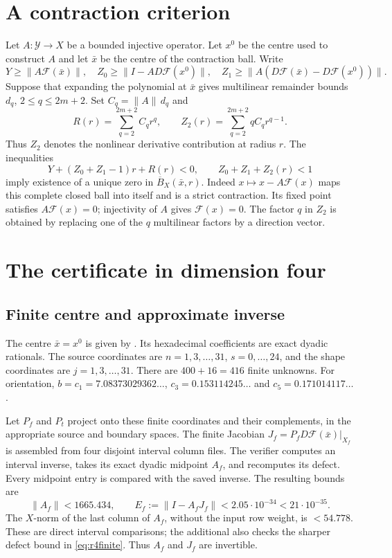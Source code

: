 \documentclass[11pt]{amsart}
\theoremstyle{remark}
\numberwithin{equation}{section}
\newcommand{\F}{\mathcal F}
\newcommand{\norm}[1]{\lVert#1\rVert}
\newcommand{\Pf}{P_f}
\newcommand{\Pt}{P_t}
\begin{document}
\section{A contraction criterion}\label{sec:contraction}
Let $A:\mathcal Y\to X$ be a bounded injective operator. Let $x^0$ be
the centre used to construct $A$ and let $\bar x$ be the centre of the
contraction ball. Write
\[
 Y\ge\norm{A\F(\bar x)},\quad
 Z_0\ge\norm{I-AD\F(x^0)},\quad
 Z_1\ge\norm{A(D\F(\bar x)-D\F(x^0))}.
\]
Suppose that expanding the polynomial at $\bar x$ gives multilinear
remainder bounds $d_q$, $2\le q\le 2m+2$. Set $C_q=\norm A\,d_q$ and
\[
 R(r)=\sum_{q=2}^{2m+2}C_qr^q,\qquad
 Z_2(r)=\sum_{q=2}^{2m+2}qC_qr^{q-1}.
\]
Thus $Z_2$ denotes the nonlinear derivative contribution at radius $r$.
The inequalities
\begin{equation}\label{eq:radii}
 Y+(Z_0+Z_1-1)r+R(r)<0,\qquad
 Z_0+Z_1+Z_2(r)<1
\end{equation}
imply existence of a unique zero in $\overline B_X(\bar x,r)$.
Indeed $x\mapsto x-A\F(x)$ maps this complete closed ball into itself and
is a strict contraction. Its fixed point satisfies $A\F(x)=0$;
injectivity of $A$ gives $\F(x)=0$. The factor $q$ in $Z_2$ is obtained
by replacing one of the $q$ multilinear factors by a direction vector.

\section{The certificate in dimension four}\label{sec:r4}
\subsection{Finite centre and approximate inverse}
The centre $\bar x=x^0$ is given by
. Its hexadecimal coefficients are
exact dyadic rationals. The source coordinates are $n=1,3,\ldots,31$,
$s=0,\ldots,24$, and the shape coordinates are $j=1,3,\ldots,31$.
There are $400+16=416$ finite unknowns. For orientation,
$b=c_1=7.08373029362\ldots$,
$c_3=0.153114245\ldots$ and $c_5=0.171014117\ldots$.

Let $\Pf$ and $\Pt$ project onto these finite coordinates and their
complements, in the appropriate source and boundary spaces.
The finite Jacobian $J_f=\Pf D\F(\bar x)|_{X_f}$ is assembled from four
disjoint interval column files. The verifier computes an interval
inverse, takes its exact dyadic midpoint $A_f$, and recomputes its
defect. Every midpoint entry is compared with the saved inverse.
The resulting bounds are
\begin{equation}\label{eq:r4finite}
 \norm{A_f}<1665.434,\qquad
 E_f:=\norm{I-A_fJ_f}<2.05\cdot10^{-34}<21\cdot10^{-35}.
\end{equation}
The $X$-norm of the last column of $A_f$, without the input row weight,
is $<54.778$. These are direct interval comparisons; the additional
 also checks the sharper defect bound in
\eqref{eq:r4finite}. Thus $A_f$ and $J_f$ are invertible.
\end{document}
